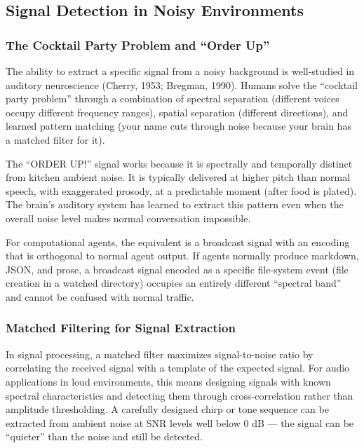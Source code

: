 \documentclass[11pt,letterpaper]{article}
\begin{document}
\subsection{Signal Detection in Noisy Environments}

\subsubsection{The Cocktail Party Problem and ``Order Up''}

The ability to extract a specific signal from a noisy background is well-studied in auditory neuroscience (Cherry, 1953; Bregman, 1990). Humans solve the ``cocktail party problem'' through a combination of spectral separation (different voices occupy different frequency ranges), spatial separation (different directions), and learned pattern matching (your name cuts through noise because your brain has a matched filter for it).

The ``ORDER UP!'' signal works because it is spectrally and temporally distinct from kitchen ambient noise. It is typically delivered at higher pitch than normal speech, with exaggerated prosody, at a predictable moment (after food is plated). The brain's auditory system has learned to extract this pattern even when the overall noise level makes normal conversation impossible.

For computational agents, the equivalent is a broadcast signal with an encoding that is orthogonal to normal agent output. If agents normally produce markdown, JSON, and prose, a broadcast signal encoded as a specific file-system event (file creation in a watched directory) occupies an entirely different ``spectral band'' and cannot be confused with normal traffic.

\subsubsection{Matched Filtering for Signal Extraction}

In signal processing, a matched filter maximizes signal-to-noise ratio by correlating the received signal with a template of the expected signal. For audio applications in loud environments, this means designing signals with known spectral characteristics and detecting them through cross-correlation rather than amplitude thresholding. A carefully designed chirp or tone sequence can be extracted from ambient noise at SNR levels well below 0 dB --- the signal can be ``quieter'' than the noise and still be detected.
\end{document}
